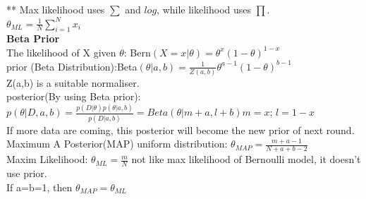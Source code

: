 \documentclass[12pt,a4paper]{extarticle}
\begin{document}
** Max likelihood uses $\sum$ and $log$, while likelihood uses $\prod$.\\
$\theta_{ML}=\frac{1}{N}\sum^N_{i=1}x_i$\\
\newline
\textbf{Beta Prior}\\
The likelihood of X given $\theta$: Bern$(X=x|\theta)=\theta ^x (1-\theta)^{1-x}$\\
prior (Beta Distribution):Beta$(\theta|a,b)= \frac{1}{Z(a,b)}\theta^{a-1}(1-\theta)^{b-1}$\\
Z(a,b) is a suitable normaliser.\\
posterior(By using Beta prior): $p(\theta|D,a,b)=\frac{p(D|\theta)p(\theta|a,b)}{p(D|a,b)}=Beta(\theta|m+a,l+b)$\quad $m=x$; $l = 1-x$\\
If more data are coming, this posterior will become the new prior of next round.\\
Maximum A Posterior(MAP) uniform distribution: $\theta_{MAP}=\frac{m+a-1}{N+a+b-2}$\\
Maxim Likelihood: $\theta_{ML}=\frac{m}{N}$ not like max likelihood of Bernoulli model, it doesn't use prior.\\
If a=b=1, then $\theta_{MAP}=\theta_{ML}$\\
\end{document}
